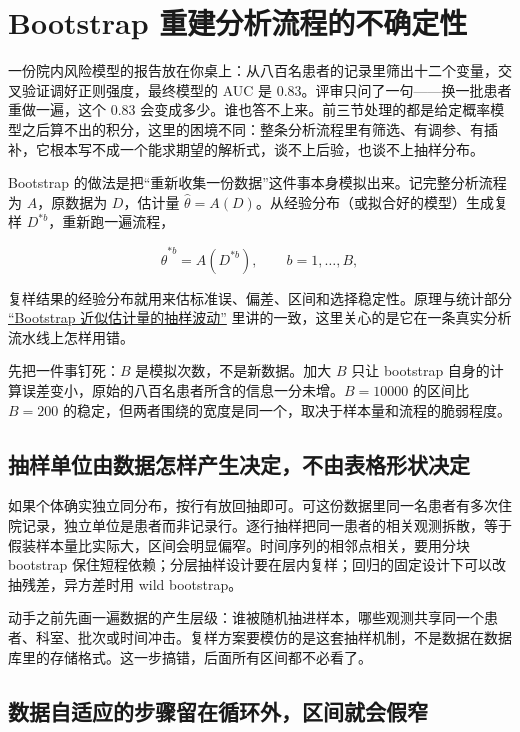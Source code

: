 \section{Bootstrap 重建分析流程的不确定性}
\label{sec:13-Machine-Learning/08-Sampling-and-Inference/04}

一份院内风险模型的报告放在你桌上：从八百名患者的记录里筛出十二个变量，交叉验证调好正则强度，最终模型的 AUC 是 \(0.83\)。评审只问了一句——换一批患者重做一遍，这个 \(0.83\) 会变成多少。谁也答不上来。前三节处理的都是给定概率模型之后算不出的积分，这里的困境不同：整条分析流程里有筛选、有调参、有插补，它根本写不成一个能求期望的解析式，谈不上后验，也谈不上抽样分布。

Bootstrap 的做法是把``重新收集一份数据''这件事本身模拟出来。记完整分析流程为 \(A\)，原数据为 \(D\)，估计量 \(\widehat\theta=A(D)\)。从经验分布（或拟合好的模型）生成复样 \(D^{*b}\)，重新跑一遍流程，

\[
\widehat\theta^{*b}=A(D^{*b}),\qquad b=1,\ldots,B,
\]

复样结果的经验分布就用来估标准误、偏差、区间和选择稳定性。原理与统计部分 \hyperref[sec:11-Mathematical-Statistics/06-Resampling-and-Model-Selection/01]{``Bootstrap 近似估计量的抽样波动''} 里讲的一致，这里关心的是它在一条真实分析流水线上怎样用错。

先把一件事钉死：\(B\) 是模拟次数，不是新数据。加大 \(B\) 只让 bootstrap 自身的计算误差变小，原始的八百名患者所含的信息一分未增。\(B=10000\) 的区间比 \(B=200\) 的稳定，但两者围绕的宽度是同一个，取决于样本量和流程的脆弱程度。

\subsection{抽样单位由数据怎样产生决定，不由表格形状决定}

如果个体确实独立同分布，按行有放回抽即可。可这份数据里同一名患者有多次住院记录，独立单位是患者而非记录行。逐行抽样把同一患者的相关观测拆散，等于假装样本量比实际大，区间会明显偏窄。时间序列的相邻点相关，要用分块 bootstrap 保住短程依赖；分层抽样设计要在层内复样；回归的固定设计下可以改抽残差，异方差时用 wild bootstrap。

动手之前先画一遍数据的产生层级：谁被随机抽进样本，哪些观测共享同一个患者、科室、批次或时间冲击。复样方案要模仿的是这套抽样机制，不是数据在数据库里的存储格式。这一步搞错，后面所有区间都不必看了。

\subsection{数据自适应的步骤留在循环外，区间就会假窄}

